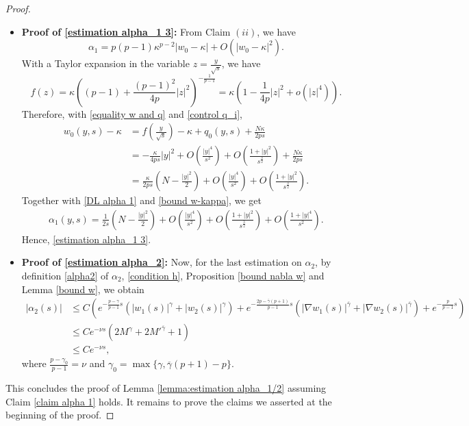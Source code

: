 \documentclass[11pt,a4paper]{article}
\newcommand{\1}{\mathbbm{1}}
\numberwithin{equation}{section}
\theoremstyle{remark}
\begin{document}
\begin{proof}
\begin{itemize}
\item \textbf{Proof of \eqref{estimation alpha_1 3}: } From Claim $(ii)$, we have
\begin{equation}\label{DL alpha 1}
\alpha_1= p(p-1)\kappa^{p-2}|w_0-\kappa|+ O(|w_0-\kappa|^2).
\end{equation}
With a Taylor expansion in the variable $z=\frac{y}{\sqrt{s}}$, we have
$$f(z)=\kappa\left((p-1)+\frac{(p-1)^2}{4p}|z|^2\right)^{-\frac{1}{p-1}}=\kappa\left(1-\frac{1}{4p}|z|^2+o(|z|^4)\right).$$
Therefore, with \eqref{equality w and q} and \eqref{control q_i},
\begin{equation}
\begin{split}
w_0(y,s)-\kappa&=f\left(\frac{y}{\sqrt{s}}\right)-\kappa+q_0(y,s)+\frac{N\kappa}{2ps}\\
&=-\frac{\kappa }{4ps}|y|^2+O\left(\frac{|y|^4}{s^2}\right)+O\left(\frac{1+|y|^2}{s^{\frac{3}{2}}}\right)+\frac{N\kappa}{2ps}\\
&=\frac{\kappa}{2ps}\left(N-\frac{|y|^2}{2}\right)+O\left(\frac{|y|^4}{s^2}\right)+O\left(\frac{1+|y|^2}{s^{\frac{3}{2}}}\right).
\end{split}
\end{equation}
Together with \eqref{DL alpha 1} and \eqref{bound w-kappa}, we get
\begin{equation}
\begin{split}
\alpha_1(y,s)=\frac{1}{2s}\left(N-\frac{|y|^2}{2}\right)+O\left(\frac{|y|^4}{s^2}\right)+O\left(\frac{1+|y|^2}{s^{\frac{3}{2}}}\right)+O\left(\frac{1+|y|^4}{s^{2}}\right).
\end{split}
\end{equation}
Hence, \eqref{estimation alpha_1 3}.

\item \textbf{Proof of \eqref{estimation alpha_2}: } Now, for the last estimation on $\alpha_2$, by definition \eqref{alpha2} of $\alpha_2$,  \eqref{condition h}, Proposition \eqref{bound nabla w} and Lemma \eqref{bound w}, we obtain
\begin{equation}\label{alpha 2 bound computations}
\begin{split}
|\alpha_2(s)|&\leq C\left(e^{-\frac{p-\gamma}{p-1}s}(|w_1(s)|^\gamma+|w_2(s)|^\gamma)+e^{-\frac{2p-\overline{\gamma}(p+1)}{p-1}s}(|\nabla w_1(s)|^{\overline{\gamma}}+|\nabla w_2(s)|^{\overline{\gamma}})+e^{-\frac{p}{p-1} s}\right)\\
&\leq Ce^{-\nu s}\left(2M^\gamma+2M'^{\overline{\gamma}}+1\right)\\
&\leq Ce^{-\nu s},
\end{split}
\end{equation}
where $\frac{p-\gamma_0}{p-1}=\nu$ and $\gamma_0=\max\{\gamma,\overline{\gamma}(p+1)-p\}$.
\end{itemize}
This concludes the proof of Lemma \ref{lemma:estimation alpha_1/2} assuming Claim \ref{claim alpha 1} holds.
It remains to prove the claims we asserted at the beginning of the proof.
\end{proof}
\end{document}
